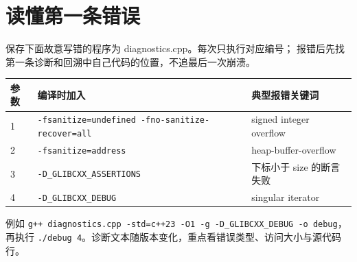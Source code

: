 \newpage
\section{读懂第一条错误}
保存下面故意写错的程序为 diagnostics.cpp。每次只执行对应编号；
报错后先找第一条诊断和回溯中自己代码的位置，不追最后一次崩溃。

\begin{longtable}{p{22mm}>{\raggedright\arraybackslash}p{70mm}p{64mm}}\toprule 参数 & 编译时加入 & 典型报错关键词\\\midrule\endhead
1 & \texttt{-fsanitize=undefined -fno-sanitize-recover=all} & signed integer overflow\\
2 & \texttt{-fsanitize=address} & heap-buffer-overflow\\
3 & \texttt{-D\_GLIBCXX\_ASSERTIONS} & 下标小于 size 的断言失败\\
4 & \texttt{-D\_GLIBCXX\_DEBUG} & singular iterator\\\bottomrule
\end{longtable}
例如 \texttt{g++ diagnostics.cpp -std=c++23 -O1 -g -D\_GLIBCXX\_DEBUG -o debug}，
再执行 \texttt{./debug 4}。诊断文本随版本变化，重点看错误类型、访问大小与源代码行。
\newpage
